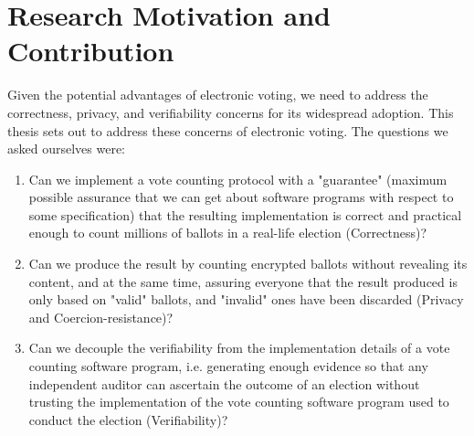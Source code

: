 \section{Research Motivation and Contribution}
Given the potential advantages of electronic voting,  we need to address
the correctness, privacy, and verifiability concerns for its widespread adoption. 
This thesis sets out to address these concerns of electronic voting. 
The questions we asked ourselves were:
 \begin{enumerate} 
  \item Can we implement a vote counting protocol with a "guarantee"
  (maximum possible assurance that we can get about software programs
   with respect to some specification) 
   that the resulting implementation is correct and  practical enough
    to count  millions of ballots in a real-life election (Correctness)?

  \item Can we produce the result by counting encrypted ballots without revealing 
  its content, and at the same time, 
  assuring everyone that the result produced is only based on "valid" ballots, 
  and "invalid" ones have been discarded  (Privacy and Coercion-resistance)?
 \item Can we decouple the verifiability from the implementation details of a vote counting software program, i.e. 
    generating enough evidence so that any independent auditor can 
    ascertain the outcome of an election without trusting the implementation 
    of the vote counting software program used to conduct the election (Verifiability)?
  \end{enumerate}



